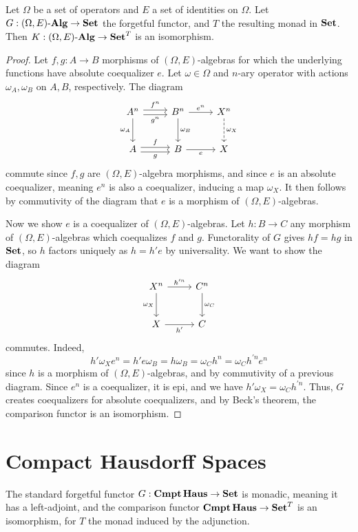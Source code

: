 \begin{theorem}\label{thm:6.7}
	Let $\Omega$ be a set of operators and $E$ a set of identities on $\Omega$. Let $G : (\Omega,E)\text{-} \mathbf{Alg}  \to \mathbf{Set} $ the forgetful functor, and $T$ the resulting monad in $\mathbf{Set} $. Then $K : (\Omega,E)\text{-} \mathbf{Alg}  \to \mathbf{Set} ^T$ is an isomorphism.
\end{theorem}
\begin{proof}
	Let $f,g : A \to B$ morphisms of $(\Omega,E)$-algebras for which the underlying functions have absolute coequalizer $e$. Let $\omega\in\Omega$ and $n$-ary operator with actions $\omega_A,\omega_B$ on $A,B$, respectively. The diagram
	\[\begin{tikzcd}[row sep = 2.5em, column sep = 2.5em]
	A^n \ar[" f^n ", shift left, r] \ar[" g^n "', shift right, r]\ar[" \omega_A "', d] & B^n \ar[" e^n ", r]  \ar[" \omega_B ", d] & X^n \ar[" \omega_X ", dashed, d]  \\
	A \ar[" f ", shift left, r] \ar[" g "', shift right, r]  & B \ar[" e "', r]  & X
	\end{tikzcd}\]
	commute since $f,g$ are $(\Omega,E)$-algebra morphisms, and since $e$ is an absolute coequalizer, meaning $e^n$ is also a coequalizer, inducing a map $\omega_X$. It then follows by commutivity of the diagram that $e$ is a morphism of $(\Omega,E)$-algebras.

	Now we show $e$ is a coequalizer of $(\Omega,E)$-algebras. Let $h : B \to C$ any morphism of $(\Omega,E)$-algebras which coequalizes $f$ and $g$. Functorality of $G$ gives $hf=hg$ in $\mathbf{Set} $, so $h$ factors uniquely as $h=h'e$ by universality. We want to show the diagram
	\[\begin{tikzcd}[row sep = 2.5em, column sep = 2.5em]
	X^n \ar[" h^{\prime n}  ", r] \ar[" \omega_X "', d]  & C^n \ar[" \omega_C ", d]  \\
	X\ar[" h' "', r]  & C
	\end{tikzcd}\]
	commutes. Indeed,
	\[
		h'\omega_X e^n = h' e\omega_B = h\omega_B=\omega_Ch^n=\omega_C h^{\prime n} e^n
	\]
	since $h$ is a morphism of $(\Omega,E)$-algebras, and by commutivity of a previous diagram. Since $e^n$ is a coequalizer, it is epi, and we have $h'\omega_X=\omega_C h^{\prime n} $. Thus, $G$ creates coequalizers for absolute coequalizers, and by Beck's theorem, the comparison functor is an isomorphism.
\end{proof}

\section{Compact Hausdorff Spaces}

\begin{theorem}\label{thm:6.8}
	The standard forgetful functor $G : \mathbf{Cmpt} \, \mathbf{Haus}  \to \mathbf{Set} $ is monadic, meaning it has a left-adjoint, and the comparison functor $\mathbf{Cmpt} \,\mathbf{Haus} \to \mathbf{Set}^T$ is an isomorphism, for $T$ the monad induced by the adjunction.
\end{theorem}

